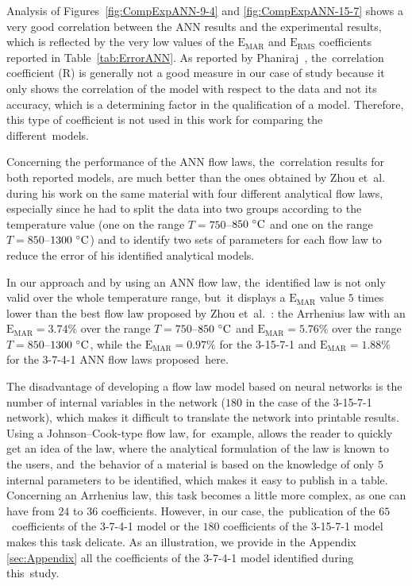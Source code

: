 \documentclass[algorithms,article,accept,pdftex,oneauthors]{Definitions/mdpi}
\DeclareRobustCommand{\RMSE}{\text{E}_\text{RMS}}
\DeclareRobustCommand{\MARE}{\text{E}_\text{MAR}}
\DeclareRobustCommand{\R}{\text{R}}
\begin{document}
Analysis of Figures~\ref{fig:CompExpANN-9-4} and \ref{fig:CompExpANN-15-7} shows a very good correlation between the ANN results and the experimental results, which is reflected by the very low values of the $\MARE$ and $\RMSE$ coefficients reported in Table~\ref{tab:ErrorANN}.
As reported by Phaniraj~\cite{Phaniraj-2003}, the~correlation coefficient ($\R$) is generally not a good measure in our case of study because it only shows the correlation of the model with respect to the data and not its accuracy, which is a determining factor in the qualification of a model.
Therefore, this type of coefficient is not used in this work for comparing the different~models.

Concerning the performance of the ANN flow laws, the~correlation results for both reported models, are much better than the ones obtained by Zhou et~al.~\cite{Zhou-2020} during his work on the same material with four different analytical flow laws, especially since he had to split the data into two groups according to the temperature value (one on the range \mbox{$T=750$--$850~\celsius$} and one on the range \mbox{$T=850$--$1300~\celsius$}) and to identify two sets of parameters for each flow law to reduce the error of his identified analytical models.

In our approach and by using an ANN flow law, the~identified law is not only valid over the whole temperature range, but~it displays a $\MARE$ value $5$ times lower than the best flow law proposed by Zhou et~al.~\cite{Zhou-2020}: the Arrhenius law with an $\MARE=3.74\%$ over the range $T=750$--$850~\celsius$ and $\MARE=5.76\%$ over the range $T=850$--$1300~\celsius$, while the $\MARE=0.97\%$ for the 3-15-7-1 and $\MARE=1.88\%$ for the 3-7-4-1 ANN flow laws proposed~here.

The disadvantage of developing a flow law model based on neural networks is the number of internal variables in the network ($180$ in the case of the 3-15-7-1 network), which makes it difficult to translate the network into printable results.
Using a Johnson--Cook-type flow law, for~example, allows the reader to quickly get an idea of the law, where the analytical formulation of the law is known to the users, and~the behavior of a material is based on the knowledge of only $5$ internal parameters to be identified, which makes it easy to publish in a table.
Concerning an Arrhenius law, this task becomes a little more complex, as one can have from $24$ to $36$ coefficients.
However, in our case, the~publication of the $65$~coefficients of the 3-7-4-1 model or the $180$ coefficients of the 3-15-7-1 model makes this task delicate.
As an illustration, we provide in the Appendix \ref{sec:Appendix} all the coefficients of the 3-7-4-1 model identified during this~study.
\end{document}
